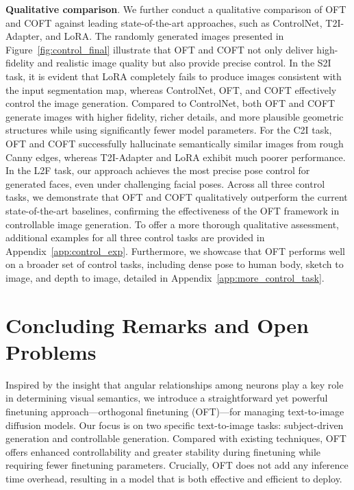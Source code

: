\textbf{Qualitative comparison}. We further conduct a qualitative comparison of OFT and COFT against leading state-of-the-art approaches, such as ControlNet, T2I-Adapter, and LoRA. The randomly generated images presented in Figure~\ref{fig:control_final} illustrate that OFT and COFT not only deliver high-fidelity and realistic image quality but also provide precise control. In the S2I task, it is evident that LoRA completely fails to produce images consistent with the input segmentation map, whereas ControlNet, OFT, and COFT effectively control the image generation. Compared to ControlNet, both OFT and COFT generate images with higher fidelity, richer details, and more plausible geometric structures while using significantly fewer model parameters. For the C2I task, OFT and COFT successfully hallucinate semantically similar images from rough Canny edges, whereas T2I-Adapter and LoRA exhibit much poorer performance. In the L2F task, our approach achieves the most precise pose control for generated faces, even under challenging facial poses. Across all three control tasks, we demonstrate that OFT and COFT qualitatively outperform the current state-of-the-art baselines, confirming the effectiveness of the OFT framework in controllable image generation. To offer a more thorough qualitative assessment, additional examples for all three control tasks are provided in Appendix~\ref{app:control_exp}. Furthermore, we showcase that OFT performs well on a broader set of control tasks, including dense pose to human body, sketch to image, and depth to image, detailed in Appendix~\ref{app:more_control_task}.

\section{Concluding Remarks and Open Problems}

Inspired by the insight that angular relationships among neurons play a key role in determining visual semantics, we introduce a straightforward yet powerful finetuning approach—orthogonal finetuning (OFT)—for managing text-to-image diffusion models. Our focus is on two specific text-to-image tasks: subject-driven generation and controllable generation. Compared with existing techniques, OFT offers enhanced controllability and greater stability during finetuning while requiring fewer finetuning parameters. Crucially, OFT does not add any inference time overhead, resulting in a model that is both effective and efficient to deploy.

